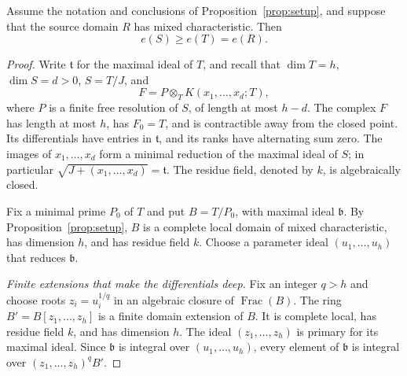 \begin{theorem}\label{thm:mixed-characteristic}
Assume the notation and conclusions of Proposition~\ref{prop:setup},
and suppose that the source domain $R$ has mixed characteristic.
Then
\[
 e(S)\geq e(T)=e(R).
\]
\end{theorem}

\begin{proof}
Write $\mathfrak t$ for the maximal ideal of $T$, and recall that
$\dim T=h$, $\dim S=d>0$, $S=T/J$, and
\[
 F=P\otimes_T K(x_1,\ldots,x_d;T),
\]
where $P$ is a finite free resolution of $S$, of length at most
$h-d$.  The complex $F$ has length at most $h$, has $F_0=T$, and is
contractible away from the closed point.  Its differentials have
entries in $\mathfrak t$, and its ranks have alternating sum zero.
The images of $x_1,\ldots,x_d$ form a minimal reduction of the maximal
ideal of $S$; in particular $\sqrt{J+(x_1,\ldots,x_d)}=\mathfrak t$.
The residue field, denoted by $k$, is algebraically closed.

Fix a minimal prime $P_0$ of $T$ and put
$B=T/P_0$, with maximal ideal $\mathfrak b$.  By
Proposition~\ref{prop:setup}, $B$ is a complete local domain of mixed
characteristic, has dimension $h$, and has residue field $k$.
Choose a parameter ideal $(u_1,\ldots,u_h)$ that reduces
$\mathfrak b$.

\medskip
\noindent\emph{Finite extensions that make the differentials deep.}
Fix an integer $q>h$ and choose roots $z_i=u_i^{1/q}$ in an algebraic
closure of $\operatorname{Frac}(B)$.  The ring
$B'=B[z_1,\ldots,z_h]$ is a finite domain extension of $B$.
It is complete local, has residue field $k$, and has dimension $h$.
The ideal $(z_1,\ldots,z_h)$ is primary for its maximal ideal.
Since $\mathfrak b$ is integral over $(u_1,\ldots,u_h)$, every
element of $\mathfrak b$ is integral over $(z_1,\ldots,z_h)^qB'$.


\end{proof}
